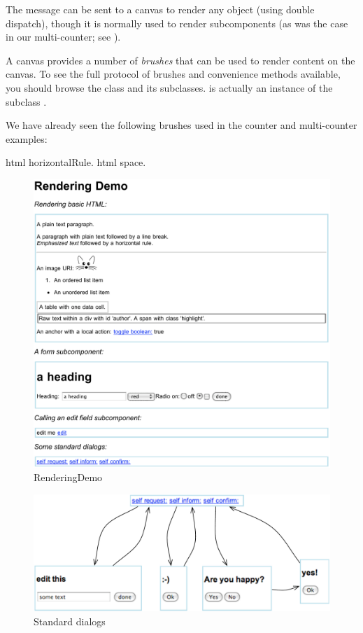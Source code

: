 \documentclass[a4paper,10pt,twoside]{book}
\begin{document}
The message  can be sent to a canvas to render any object (using double dispatch), though it is normally used to render subcomponents (as was the case in our multi-counter; see ).

A canvas provides a number of \emph{brushes} that can be used to render content on the canvas.
To see the full protocol of brushes and convenience methods available, you should browse the class  and its subclasses.
 is actually an instance of the subclass .

We have already seen the following brushes used in the counter and multi-counter examples:
\begin{code}{}
html horizontalRule.
html space.
\end{code}





\begin{figure}[ht]
\begin{center}
\includegraphics[width=\textwidth]{RenderingDemo}
\caption{RenderingDemo}
\label{fig:RenderingDemo}
\end{center}
\end{figure}


\begin{figure}[ht]
\begin{center}
\includegraphics[width=\textwidth]{dialogs}
\caption{Standard dialogs}
\label{fig:dialogs}
\end{center}
\end{figure}
\end{document}
